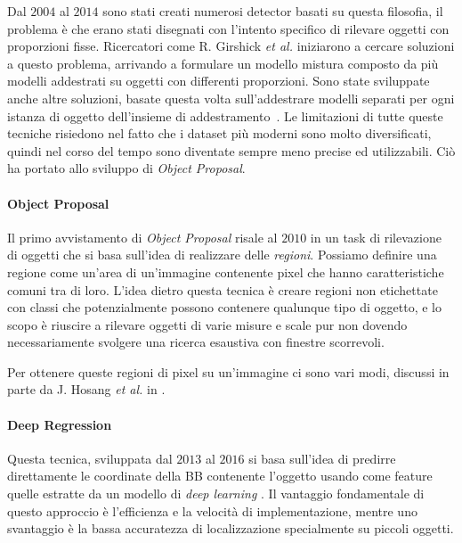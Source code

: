 Dal $2004$ al $2014$ sono stati creati numerosi detector basati su questa filosofia, il problema è che erano stati disegnati con l'intento specifico di rilevare oggetti con proporzioni fisse. Ricercatori come R. Girshick \textit{et al.} iniziarono a cercare soluzioni a questo problema, arrivando a formulare un modello mistura \cite{felzenszwalb2009object} composto da più modelli addestrati su oggetti con differenti proporzioni. Sono state sviluppate anche altre soluzioni, basate questa volta sull'addestrare modelli separati per ogni istanza di oggetto dell'insieme di addestramento \cite{malisiewicz2011ensemble, malisiewicz2011exemplar}. Le limitazioni di tutte queste tecniche risiedono nel fatto che i dataset più moderni sono molto diversificati, quindi nel corso del tempo sono diventate sempre meno precise ed utilizzabili. Ciò ha portato allo sviluppo di \textit{Object Proposal}.
\paragraph{Object Proposal}
Il primo avvistamento di \textit{Object Proposal} risale al $2010$ in un task di rilevazione di oggetti \cite{alexe2010object} che si basa sull'idea di realizzare delle \textit{regioni}.
Possiamo definire una regione come un'area di un'immagine contenente pixel che hanno caratteristiche comuni tra di loro. L'idea dietro questa tecnica è creare regioni non etichettate con classi che potenzialmente possono contenere qualunque tipo di oggetto, e lo scopo è riuscire a rilevare oggetti di varie misure e scale pur non dovendo necessariamente svolgere una ricerca esaustiva con finestre scorrevoli.

Per ottenere queste regioni di pixel su un'immagine ci sono vari modi, discussi in parte da J. Hosang \textit{et al.} in \cite{hosang2015makes}.
\paragraph{Deep Regression}
Questa tecnica, sviluppata dal $2013$ al $2016$ si basa sull'idea di predirre direttamente le coordinate della \ac{BB} contenente l'oggetto usando come feature quelle estratte da un modello di \textit{deep learning} \cite{redmon2016you}. Il vantaggio fondamentale di questo approccio è l'efficienza e la velocità di implementazione, mentre uno svantaggio è la bassa accuratezza di localizzazione specialmente su piccoli oggetti.

